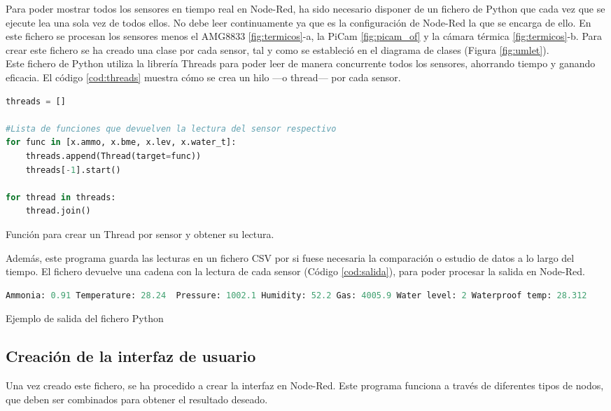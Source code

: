 Para poder mostrar todos los sensores en tiempo real en Node-Red, ha sido necesario disponer de un fichero de Python que cada vez que se ejecute lea una sola vez de todos ellos. No debe leer continuamente ya que es la configuración de Node-Red la que se encarga de ello. En este fichero se procesan los sensores menos el AMG8833 \ref{fig:termicos}-a, la PiCam \ref{fig:picam_of} y la cámara térmica \ref{fig:termicos}-b. Para crear este fichero se ha creado una clase por cada sensor, tal y como se estableció en el diagrama de clases (Figura \ref{fig:umlet}).\\

Este fichero de Python utiliza la librería Threads para poder leer de manera concurrente todos los sensores, ahorrando tiempo y ganando eficacia. El código \ref{cod:threads} muestra cómo se crea un hilo ---o thread--- por cada sensor.\\
\begin{code}[h]
\begin{lstlisting}[language=Python]
threads = []

#Lista de funciones que devuelven la lectura del sensor respectivo
for func in [x.ammo, x.bme, x.lev, x.water_t]: 
	threads.append(Thread(target=func))
	threads[-1].start()
	
for thread in threads:
	thread.join()
\end{lstlisting}
\caption[Función para crear un Thread por sensor y obtener su lectura.]{Función para crear un Thread por sensor y obtener su lectura.}
\label{cod:threads}
\end{code}

Además, este programa guarda las lecturas en un fichero CSV por si fuese necesaria la comparación o estudio de datos a lo largo del tiempo. El fichero devuelve una cadena con la lectura de cada sensor (Código \ref{cod:salida}), para poder procesar la salida en Node-Red.\\
\begin{code}[h]
\begin{lstlisting}[language=Python]
Ammonia: 0.91 Temperature: 28.24  Pressure: 1002.1 Humidity: 52.2 Gas: 4005.9 Water level: 2 Waterproof temp: 28.312
\end{lstlisting}
\caption[Ejemplo de salida del fichero Python]{Ejemplo de salida del fichero Python}
\label{cod:salida}
\end{code}

\subsection{Creación de la interfaz de usuario}
Una vez creado este fichero, se ha procedido a crear la interfaz en Node-Red. Este programa funciona a través de diferentes tipos de nodos, que deben ser combinados para obtener el resultado deseado.\\

